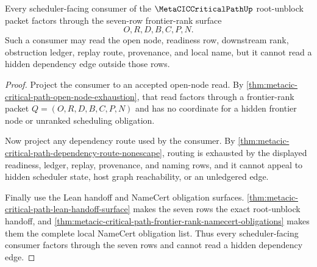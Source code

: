 \begin{theorem}
\label{thm:metacic-critical-path-frontier-rank-consumer-exactness}
Every scheduler-facing consumer of the $\MetaCICCriticalPathUp$ root-unblock packet factors through the seven-row frontier-rank surface
$$
O,R,D,B,C,P,N.
$$
Such a consumer may read the open node, readiness row, downstream rank, obstruction ledger, replay route, provenance, and local name, but it cannot read a hidden dependency edge outside those rows.
\end{theorem}
\begin{proof}
Project the consumer to an accepted open-node read. By \autoref{thm:metacic-critical-path-open-node-exhaustion}, that read factors through a frontier-rank packet $Q=(O,R,D,B,C,P,N)$ and has no coordinate for a hidden frontier node or unranked scheduling obligation.

Now project any dependency route used by the consumer. By \autoref{thm:metacic-critical-path-dependency-route-nonescape}, routing is exhausted by the displayed readiness, ledger, replay, provenance, and naming rows, and it cannot appeal to hidden scheduler state, host graph reachability, or an unledgered edge.

Finally use the Lean handoff and NameCert obligation surfaces. \autoref{thm:metacic-critical-path-lean-handoff-surface} makes the seven rows the exact root-unblock handoff, and \autoref{thm:metacic-critical-path-frontier-rank-namecert-obligations} makes them the complete local NameCert obligation list. Thus every scheduler-facing consumer factors through the seven rows and cannot read a hidden dependency edge.
\end{proof}

